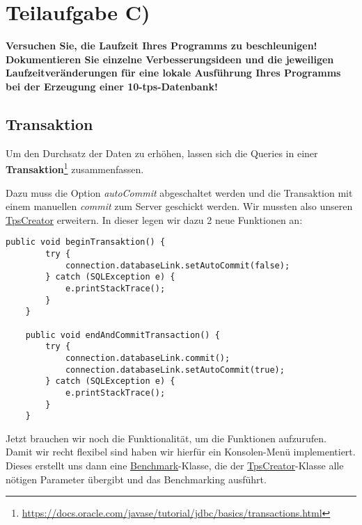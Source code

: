 \section{Teilaufgabe C)}
\textbf{Versuchen Sie, die Laufzeit Ihres Programms zu beschleunigen! Dokumentieren Sie
einzelne Verbesserungsideen und die jeweiligen Laufzeitveränderungen für eine lokale
Ausführung Ihres Programms bei der Erzeugung einer 10-tps-Datenbank!}

\subsection{Transaktion}
Um den Durchsatz der Daten zu erhöhen, lassen sich die Queries in einer
\textbf{Transaktion}\footnote{\url{https://docs.oracle.com/javase/tutorial/jdbc/basics/transactions.html}} zusammenfassen.  

Dazu muss die Option \textit{autoCommit} abgeschaltet werden und die Transaktion
mit einem manuellen \textit{commit} zum Server geschickt werden. Wir mussten
also unseren \hyperref[lst:tpsv2]{TpsCreator} erweitern. In
dieser legen wir dazu 2 neue Funktionen an:

\begin{lstlisting}[caption={Erweiterung der TpsCreator-Klasse}]
	public void beginTransaktion() {
		try {
			connection.databaseLink.setAutoCommit(false);
		} catch (SQLException e) {
			e.printStackTrace();
		}
	}
	
	public void endAndCommitTransaction() {
		try {
			connection.databaseLink.commit();
			connection.databaseLink.setAutoCommit(true);
		} catch (SQLException e) {
			e.printStackTrace();
		}
	}
\end{lstlisting}

Jetzt brauchen wir noch die Funktionalität, um die Funktionen aufzurufen. Damit
wir recht flexibel sind haben wir hierfür ein Konsolen-Menü implementiert.
Dieses erstellt uns dann eine  \hyperref[lst:bmv2]{Benchmark}-Klasse, die der
\hyperref[lst:tpsv2]{TpsCreator}-Klasse alle nötigen Parameter übergibt und das Benchmarking ausführt.\\

